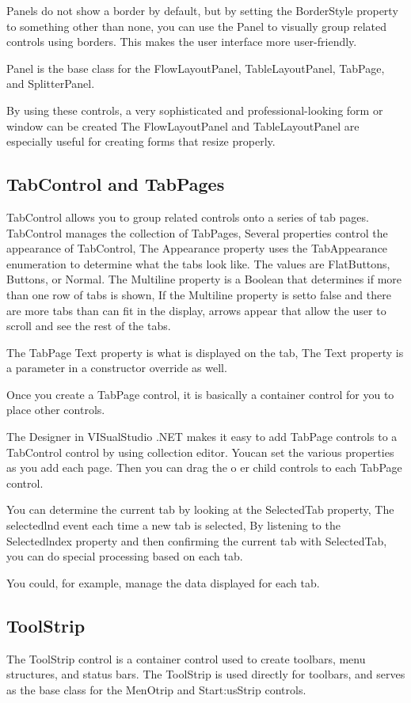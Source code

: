 Panels do not show a border by default, but by setting the BorderStyle property to something other than none, you can use the Panel to visually group related controls using borders. This makes the user interface more user-friendly.

Panel is the base class for the FlowLayoutPanel, TableLayoutPanel, TabPage, and SplitterPanel.

By using these controls, a very sophisticated and professional-looking form or window can be created The FlowLayoutPanel and TableLayoutPanel are especially useful for creating forms that resize properly.

\subsection{TabControl and TabPages}
TabControl allows you to group related controls onto a series of tab pages. TabControl manages the collection of TabPages, Several properties control the appearance of TabControl, The Appearance property uses the TabAppearance enumeration to determine what the tabs look like. The values are FlatButtons, Buttons, or Normal. The Multiline property is a Boolean that determines if more than
one row of tabs is shown, If the Multiline property is setto false and there are more tabs than can fit in the display, arrows appear that allow the user to scroll and see the rest of the tabs.

The TabPage Text property is what is displayed on the tab, The Text property is a parameter in a constructor override as well.

Once you create a TabPage control, it is basically a container control for you to place other controls.

The Designer in VISualStudio .NET makes it easy to add TabPage controls to a TabControl control by using collection editor. Youcan set the various properties as you add each page. Then you can drag the o er child controls to each TabPage control.

You can determine the current tab by looking at the SelectedTab property, The selectedlnd event each time a new tab is selected, By listening to the Selectedlndex property and then confirming the current tab with SelectedTab, you can do special processing based on each tab.

You could, for example, manage the data displayed for each tab.

\subsection{ToolStrip}
The ToolStrip control is a container control used to create toolbars, menu structures, and status bars. The ToolStrip is used directly for toolbars, and serves as the base class for the MenOtrip and Start:usStrip controls.

